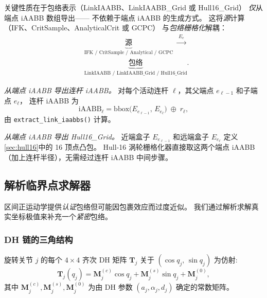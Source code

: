 \documentclass[journal]{IEEEtran}
\newcommand{\iAABB}{\text{iAABB}}
\newcommand{\bT}{\mathbf{T}}
\begin{document}
关键性质在于包络表示（LinkIAABB、LinkIAABB\_Grid 或 Hull16\_Grid）
\emph{仅}从端点 iAABB 数组导出——
不依赖于端点 iAABB 的生成方式。
这将\emph{源}计算（IFK、CritSample、AnalyticalCrit 或 GCPC）
与\emph{包络栅格化}解耦：
\begin{equation}\label{eq:pipeline}
  \begin{aligned}
    &\underbrace{\text{源}}_{\text{IFK / CritSample / Analytical / GCPC}}
    \;\xrightarrow{\;E_e\;} \\
    &\underbrace{\text{包络}}_{\text{LinkIAABB / LinkIAABB\_Grid / Hull16\_Grid}}.
  \end{aligned}
\end{equation}

\emph{从端点 iAABB 导出连杆 iAABB。}
对每个活动连杆 $\ell$，其父端点 $e_{\ell-1}$ 和子端点 $e_\ell$，
连杆 iAABB 为
\begin{equation}
  \iAABB_\ell = \mathrm{bbox}\bigl(E_{e_{\ell-1}},\, E_{e_\ell}\bigr)
  \;\oplus\; r_\ell,
\end{equation}
由 \texttt{extract\_link\_iaabbs()} 计算。

\emph{从端点 iAABB 导出 Hull16\_Grid。}
近端盒子 $E_{e_{\ell-1}}$ 和远端盒子 $E_{e_\ell}$
定义\cref{sec:hull16}中的 16 顶点凸包。
Hull-16 涡轮栅格化器直接取这两个端点 iAABB
（加上连杆半径），无需经过连杆 iAABB 中间步骤。

\subsection{解析临界点求解器}\label{sec:critical}

区间正运动学提供\emph{认证}包络但可能因包裹效应而过度近似。
我们通过解析求解真实坐标极值来补充一个\emph{紧密}包络。


\subsubsection{DH 链的三角结构}\label{sec:critical_structure}

旋转关节 $j$ 的每个 $4{\times}4$ 齐次 DH 矩阵 $\bT_j$
关于 $(\cos q_j,\,\sin q_j)$ 为仿射:
\begin{equation}\label{eq:dh_affine}
  \bT_j(q_j)
  = \bm{M}_j^{(c)}\cos q_j
  + \bm{M}_j^{(s)}\sin q_j
  + \bm{M}_j^{(0)},
\end{equation}
其中 $\bm{M}_j^{(c)}, \bm{M}_j^{(s)}, \bm{M}_j^{(0)}$
为由 DH 参数 $(a_j,\alpha_j,d_j)$ 确定的常数矩阵。
\end{document}
